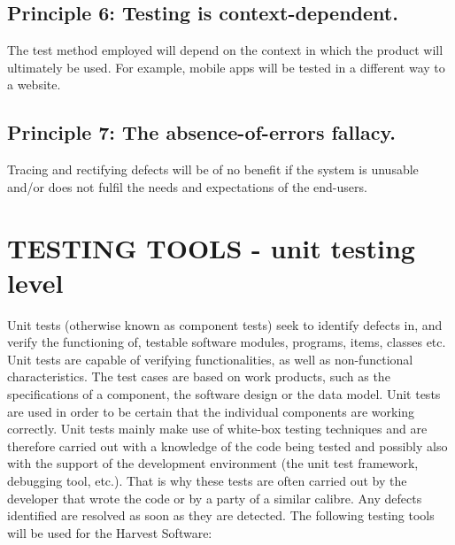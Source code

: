 \documentclass[12pt]{article}
\begin{document}
\subsection{Principle 6: Testing is context-dependent. }
The test method employed will depend on the context in which the product will ultimately be used. For example, mobile apps will be tested in a different way to a website. \newline
\subsection{Principle 7: The absence-of-errors fallacy. }
Tracing and rectifying defects will be of no benefit if the system is unusable  and/or does not fulfil the needs and expectations of the end-users. \newline

  \section{TESTING TOOLS - unit testing level}
Unit tests (otherwise known as component tests) seek to identify defects in, and verify the functioning of, testable software modules, programs, items, classes etc. \newline\newline
Unit tests are capable of verifying functionalities, as well as non-functional characteristics. The test cases are based on work products, such as the specifications of a component, the software design or the data model. Unit tests are used in order to be certain that the individual components are working correctly. \newline\newline 
Unit tests mainly make use of white-box testing techniques and are therefore carried out with a knowledge of the code being tested and possibly also with the support of the development environment (the unit test framework, debugging tool, etc.). That is why these tests are often carried out by the developer that wrote the code or by a party of a similar calibre. Any defects identified are resolved as soon as they are detected. \newline\newline
The following testing tools will be used for the Harvest Software: \newline\newline
\end{document}
